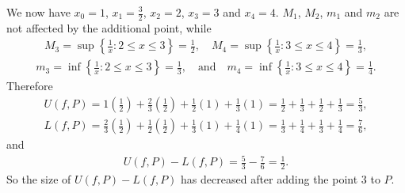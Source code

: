 \documentclass[letterpaper,10pt,english]{jupyterBook}
\begin{document}
\sphinxAtStartPar
We now have \(x_0=1\), \(x_1=\frac{3}{2}\), \(x_2=2\), \(x_3=3\) and \(x_4=4\). \(M_1\), \(M_2\), \(m_1\) and \(m_2\) are not affected by the additional point, while
\begin{equation*}
\begin{split}
M_3 = \sup\left\{\frac{1}{x}:2\leq x\leq 3\right\}=\frac{1}{2},\hspace{1em} M_4 =\sup\left\{\frac{1}{x}:3\leq x\leq 4\right\}=\frac{1}{3},
\end{split}
\end{equation*}\begin{equation*}
\begin{split}
m_3 = \inf\left\{\frac{1}{x}:2\leq x\leq 3\right\}=\frac{1}{3}, \hspace{1em} \text{and} \hspace{1em} m_4 =\inf\left\{\frac{1}{x}:3\leq x\leq 4\right\}=\frac{1}{4}.
\end{split}
\end{equation*}
\sphinxAtStartPar
Therefore
\begin{equation*}
\begin{split}
U(f,P) = 1\left(\frac{1}{2}\right) + \frac{2}{3}\left(\frac{1}{2}\right) + \frac{1}{2}(1) + \frac{1}{3}(1) = \frac{1}{2}+\frac{1}{3}+\frac{1}{2}+\frac{1}{3} = \frac{5}{3},
\end{split}
\end{equation*}\begin{equation*}
\begin{split}
L(f,P) = \frac{2}{3}\left(\frac{1}{2}\right) + \frac{1}{2}\left(\frac{1}{2}\right) + \frac{1}{3}(1) + \frac{1}{4}(1) = \frac{1}{3}+\frac{1}{4}+\frac{1}{3}+\frac{1}{4} = \frac{7}{6},
\end{split}
\end{equation*}
\sphinxAtStartPar
and
\begin{equation*}
\begin{split}
U(f,P) - L(f,P) = \frac{5}{3}-\frac{7}{6} = \frac{1}{2}.
\end{split}
\end{equation*}
\sphinxAtStartPar
So the size of \(U(f,P)-L(f,P)\) has decreased after adding the point \(3\) to \(P\).
\end{document}

